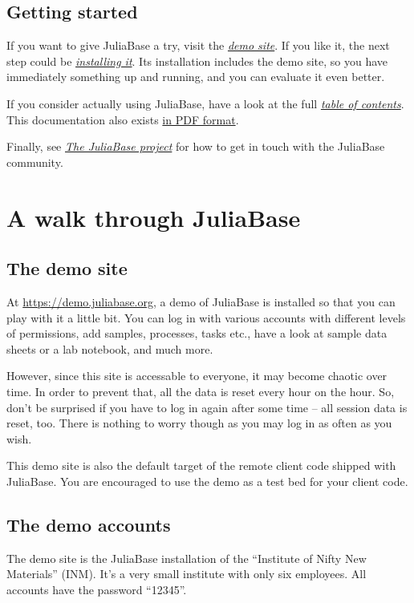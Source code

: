 \documentclass[a4paper,11pt,english]{sphinxmanual}
\begin{document}
\section{Getting started}
\label{index:getting-started}\label{index:django-web-framework}
If you want to give JuliaBase a try, visit the {\hyperref[demo::doc]{\emph{demo site}}}.  If you
like it, the next step could be {\hyperref[programming/installation::doc]{\emph{installing it}}}.  Its installation includes the demo site, so you
have immediately something up and running, and you can evaluate it even better.

If you consider actually using JuliaBase, have a look at the full {\hyperref[toc::doc]{\emph{table
of contents}}}.  This documentation also exists \href{http://www.juliabase.org/juliabase.pdf}{in PDF format}.

Finally, see {\hyperref[project::doc]{\emph{The JuliaBase project}}} for how to get in touch with the JuliaBase
community.


\chapter{A walk through JuliaBase}
\label{demo:a-walk-through-juliabase}\label{demo::doc}

\section{The demo site}
\label{demo:the-demo-site}\label{demo:index-0}
At \href{https://demo.juliabase.org}{https://demo.juliabase.org}, a demo of JuliaBase is installed so that you can
play with it a little bit.  You can log in with various accounts with different
levels of permissions, add samples, processes, tasks etc., have a look at
sample data sheets or a lab notebook, and much more.

However, since this site is accessable to everyone, it may become chaotic over
time.  In order to prevent that, all the data is reset every hour on the
hour.  So, don't be surprised if you have to log in again after some time – all
session data is reset, too.  There is nothing to worry though as you may log
in as often as you wish.

This demo site is also the default target of the remote client code shipped
with JuliaBase.  You are encouraged to use the demo as a test bed for your
client code.


\section{The demo accounts}
\label{demo:the-demo-accounts}
The demo site is the JuliaBase installation of the “Institute of Nifty New
Materials” (INM).  It's a very small institute with only six employees.  All
accounts have the password “12345”.
\end{document}
